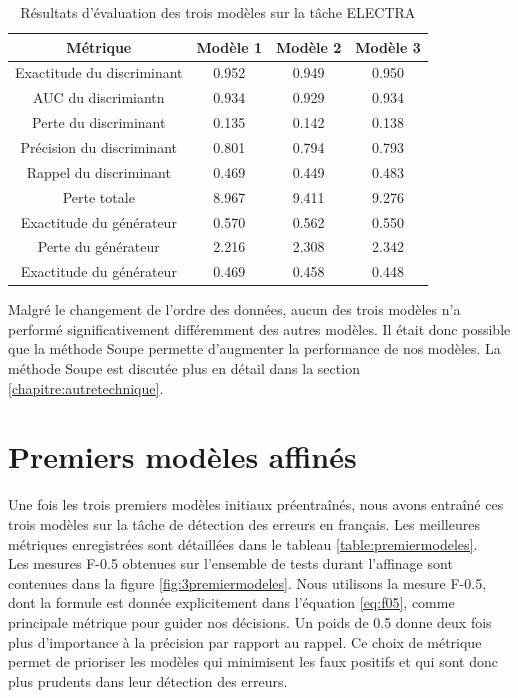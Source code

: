 \documentclass[12pt,twoside,rapport]{dms}
\theoremstyle{definition}
\numberwithin{equation}{section}
\numberwithin{table}{chapter}
\numberwithin{figure}{chapter}
\begin{document}
\begin{table}[h!]
	\centering
	\begin{tabular}{||c | c c c||}
		\hline
		Métrique                   & Modèle 1 & Modèle 2 & Modèle 3 \\ [0.5ex]
		\hline\hline
		Exactitude du discriminant & 0.952    & 0.949    & 0.950    \\
		AUC du discrimiantn        & 0.934    & 0.929    & 0.934    \\
		Perte du discriminant      & 0.135    & 0.142    & 0.138    \\
		Précision du discriminant  & 0.801    & 0.794    & 0.793    \\
		Rappel du discriminant     & 0.469    & 0.449    & 0.483    \\
		Perte totale               & 8.967    & 9.411    & 9.276    \\
		Exactitude du générateur   & 0.570    & 0.562    & 0.550    \\
		Perte du générateur        & 2.216    & 2.308    & 2.342    \\
		Exactitude du générateur   & 0.469    & 0.458    & 0.448    \\
		\hline
	\end{tabular}
	\caption{Résultats d'évaluation des trois modèles sur la tâche ELECTRA}
	\label{table:respreentrainementsanscasse}
\end{table}
Malgré le changement de l'ordre des données, aucun des trois modèles n'a
performé significativement différemment des autres modèles. Il était donc
possible que la méthode Soupe \cite{soup} permette d'augmenter la performance
de nos modèles. La méthode Soupe est discutée plus en détail dans la section
\ref{chapitre:autretechnique}.


\section{Premiers modèles affinés}\label{section:premiersmodelesaffines}
Une fois les trois premiers modèles initiaux préentraînés, nous avons entraîné
ces trois modèles sur la tâche de détection des erreurs en français. Les
meilleures métriques enregistrées sont détaillées dans le tableau
\ref{table:premiermodeles}. \\

Les mesures F-0.5 obtenues sur l'ensemble de tests durant l'affinage sont
contenues dans la figure \ref{fig:3premiermodeles}. Nous utilisons la mesure
F-0.5, dont la formule est donnée explicitement dans l'équation \ref{eq:f05},
comme principale métrique pour guider nos décisions. Un poids de 0.5 donne deux
fois plus d'importance à la précision par rapport au rappel. Ce choix de
métrique permet de prioriser les modèles qui minimisent les faux positifs et
qui sont donc plus prudents dans leur détection des erreurs.
\end{document}
